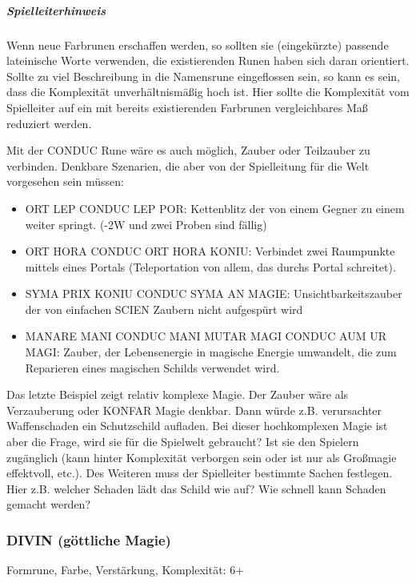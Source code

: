 \documentclass{article}
\begin{document}
\begin{mdframed}[hidealllines=true, backgroundcolor=black!10]
\subparagraph{Spielleiterhinweis}

Wenn neue Farbrunen erschaffen werden, so sollten sie (eingekürzte) passende lateinische Worte verwenden, die
existierenden Runen haben sich daran orientiert. Sollte zu viel Beschreibung in die Namensrune eingeflossen sein, so
kann es sein, dass die Komplexität unverhältnismäßig hoch ist. Hier sollte die Komplexität vom Spielleiter auf ein
mit bereits existierenden Farbrunen vergleichbares Maß reduziert werden.

Mit der CONDUC Rune wäre es auch möglich, Zauber oder Teilzauber zu verbinden. Denkbare Szenarien, die aber von der
Spielleitung für die Welt vorgesehen sein müssen:

\begin{itemize}
\item ORT LEP CONDUC LEP POR: Kettenblitz der von einem Gegner zu einem weiter springt. (-2W und zwei Proben sind fällig)
\item ORT HORA CONDUC ORT HORA KONIU: Verbindet zwei Raumpunkte mittels eines Portals (Teleportation von allem, das durchs Portal schreitet).
\item SYMA PRIX KONIU CONDUC SYMA AN MAGIE: Unsichtbarkeitszauber der von einfachen SCIEN Zaubern nicht aufgespürt wird
\item MANARE MANI CONDUC MANI MUTAR MAGI CONDUC AUM UR MAGI: Zauber, der Lebensenergie in magische Energie umwandelt, die zum Reparieren eines magischen Schilds verwendet wird.
\end{itemize}

Das letzte Beispiel zeigt relativ komplexe Magie. Der Zauber wäre als Verzauberung oder KONFAR Magie denkbar. Dann würde
z.B. verursachter Waffenschaden ein Schutzschild aufladen. Bei dieser hochkomplexen Magie ist aber die Frage, wird sie
für die Spielwelt gebraucht? Ist sie den Spielern zugänglich (kann hinter Komplexität verborgen sein oder ist nur als
Großmagie effektvoll, etc.). Des Weiteren muss der Spielleiter bestimmte Sachen festlegen. Hier z.B. welcher Schaden
lädt das Schild wie auf? Wie schnell kann Schaden gemacht werden?

\end{mdframed}
\subsubsection{DIVIN (göttliche Magie)}

Formrune, Farbe, Verstärkung, Komplexität: 6+
\end{document}
